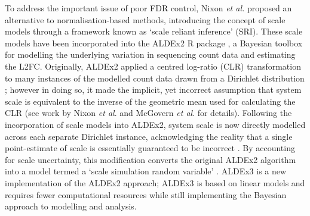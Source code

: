 \documentclass[10pt,letterpaper]{article}
\begin{document}
To address the important issue of poor FDR control, Nixon \textit{et al.} \cite{nixon_scale_2024} proposed an alternative to normalisation-based methods, introducing the concept of scale models through a framework known as `scale reliant inference' (SRI). These scale models have been incorporated into the ALDEx2 R package \cite{gloor_explicit_2025}, a Bayesian toolbox for modelling the underlying variation in sequencing count data and estimating the L2FC. Originally, ALDEx2 applied a centred log-ratio (CLR) transformation to many instances of the modelled count data drawn from a Dirichlet distribution \cite{fernandes:2014}; however in doing so, it made the implicit, yet incorrect assumption that system scale is equivalent to the inverse of the geometric mean used for calculating the CLR (see work by Nixon \textit{et al}. \cite{nixon_scale_2024} and McGovern \textit{et al}. \cite{mcgovern_addressing_2023} for details). Following the incorporation of scale models into ALDEx2, system scale is now directly modelled across each separate Dirichlet instance, acknowledging the reality that a single point-estimate of scale is essentially guaranteed to be incorrect \cite{gloor_explicit_2025}. By accounting for scale uncertainty, this modification converts the original ALDEx2 algorithm into a model termed a `scale simulation random variable' \cite{nixon_scale_2024}. ALDEx3 is a new implementation of the ALDEx2 approach; ALDEx3 is based on linear models and requires fewer computational resources while still implementing the Bayesian approach to modelling and analysis.
\end{document}
